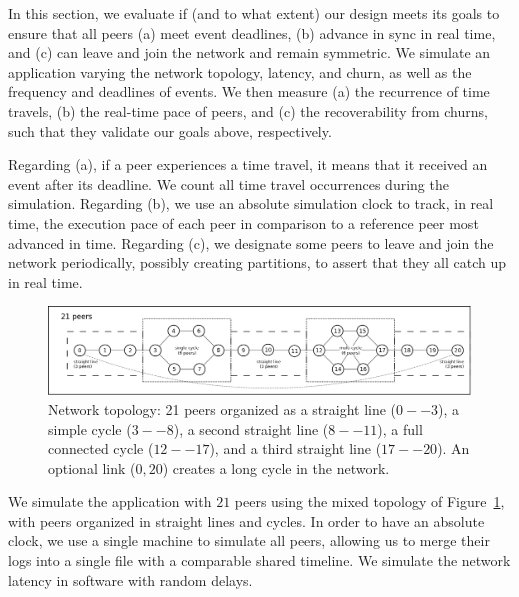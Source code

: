 \documentclass[10pt,journal,compsoc]{IEEEtran}
\begin{document}
In this section, we evaluate if (and to what extent) our design meets its goals
to ensure that all peers (a) meet event deadlines, (b) advance in sync in real
time, and (c) can leave and join the network and remain symmetric.
%
We simulate an application varying the network topology, latency, and churn, as
well as the frequency and deadlines of events.
%
We then measure (a) the recurrence of time travels, (b) the real-time pace of
peers, and (c) the recoverability from churns, such that they validate our
goals above, respectively.

Regarding (a), if a peer experiences a time travel, it means that it received
an event after its deadline.
We count all time travel occurrences during the simulation.
%
Regarding (b), we use an absolute simulation clock to track, in real time, the
execution pace of each peer in comparison to a reference peer most advanced in
time.
%
Regarding (c), we designate some peers to leave and join the network
periodically, possibly creating partitions, to assert that they all catch up in
real time.

\begin{figure}[t]
  \centering
  \includegraphics[width=\linewidth]{topo}
  \caption{
    \label{fig.topo}
    Network topology: 21 peers organized as a straight line ($0--3$), a simple
    cycle ($3--8$), a second straight line ($8--11$), a full connected cycle
    ($12--17$), and a third straight line ($17--20$).
    An optional link ($0,20$) creates a long cycle in the network.
  }
\end{figure}

We simulate the application with $21$ peers using the mixed topology of
Figure~\ref{fig.topo}, with peers organized in straight lines and cycles.
%
In order to have an absolute clock, we use a single machine to simulate all
peers, allowing us to merge their logs into a single file with a comparable
shared timeline.
%
We simulate the network latency in software with random delays.
\end{document}
